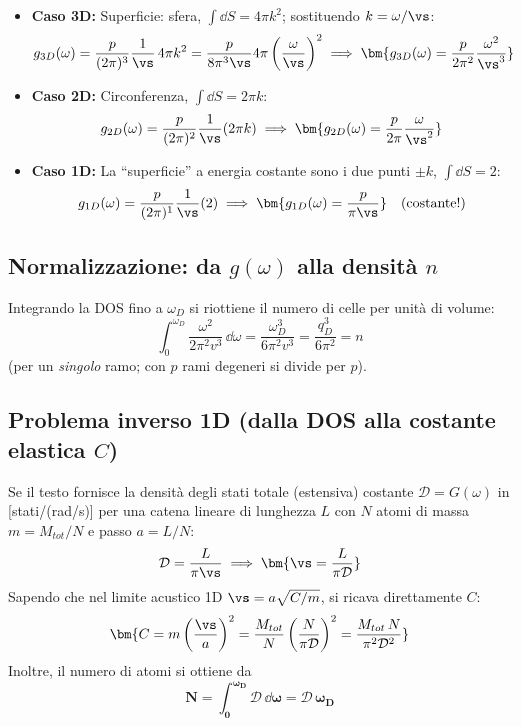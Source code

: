 \begin{itemize}
    \item \textbf{Caso 3D:} Superficie: sfera, $\int \dd S = 4\pi k^2$; sostituendo $k=\omega/\vs$:
\[ g_{3D}(\omega) = \frac{p}{(2\pi)^3}\frac{1}{\vs}\,4\pi k^2 = \frac{p}{8\pi^3 \vs}4\pi\left(\frac{\omega}{\vs}\right)^2
   \implies \bm{g_{3D}(\omega) = \frac{p}{2\pi^2}\frac{\omega^2}{\vs^3}} \]
\item \textbf{Caso 2D:} Circonferenza, $\int\dd S = 2\pi k$:
\[ g_{2D}(\omega) = \frac{p}{(2\pi)^2}\frac{1}{\vs}(2\pi k)
   \implies \bm{g_{2D}(\omega) = \frac{p}{2\pi}\frac{\omega}{\vs^2}} \]
\item \textbf{Caso 1D:} La ``superficie'' a energia costante sono i due punti $\pm k$, $\int\dd S = 2$:
\[ g_{1D}(\omega) = \frac{p}{(2\pi)^1}\frac{1}{\vs}(2) \implies \bm{g_{1D}(\omega) = \frac{p}{\pi \vs}} \quad(\text{costante!}) \]
\end{itemize}

\subsection{Normalizzazione: da $g(\omega)$ alla densità $n$}
Integrando la DOS fino a $\omega_D$ si riottiene il numero di celle per unità di volume:
\[ \int_0^{\omega_D} \frac{\omega^2}{2\pi^2 v^3}\,\dd\omega = \frac{\omega_D^3}{6\pi^2 v^3} = \frac{q_D^3}{6\pi^2} = n \]
(per un \emph{singolo} ramo; con $p$ rami degeneri si divide per $p$).

\subsection{Problema inverso 1D (dalla DOS alla costante elastica $C$)}
Se il testo fornisce la densità degli stati totale (estensiva) costante $\mathcal{D} = G(\omega)$ in [stati/(rad/s)] per una catena lineare di lunghezza $L$ con $N$ atomi di massa $m = M_{tot}/N$ e passo $a = L/N$:
\[ \mathcal{D} = \frac{L}{\pi \vs} \implies \bm{\vs = \frac{L}{\pi \mathcal{D}}} \]
Sapendo che nel limite acustico 1D $\vs = a\sqrt{C/m}$, si ricava direttamente $C$:
\[ \bm{C = m \left( \frac{\vs}{a} \right)^2 = \frac{M_{tot}}{N} \left( \frac{N}{\pi \mathcal{D}} \right)^2 = \frac{M_{tot}\,N}{\pi^2 \mathcal{D}^2}} \]
Inoltre, il numero di atomi si ottiene da \[ \bm{N = \int_0^{\omega_D}\mathcal{D}\,\dd\omega = \mathcal{D}\,\omega_D}\]

